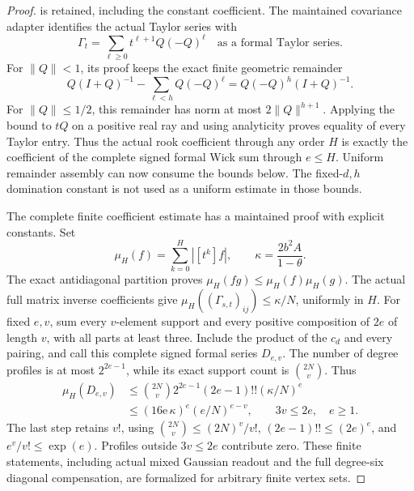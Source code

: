 \begin{proof}
is retained, including the constant coefficient.
The maintained covariance adapter identifies the actual Taylor series with
\[
 \Gamma_t=\sum_{\ell\geq0}t^{\ell+1}Q(-Q)^\ell
 \quad\text{as a formal Taylor series}.
\]
For \(\|Q\|<1\), its proof keeps the exact finite geometric remainder
\[
 Q(I+Q)^{-1}-\sum_{\ell<h}Q(-Q)^\ell
       =Q(-Q)^h(I+Q)^{-1}.
\]
For \(\|Q\|\leq1/2\), this remainder has norm at most
\(2\|Q\|^{h+1}\). Applying the bound to \(tQ\) on a positive
real ray and using analyticity proves equality of every Taylor entry.
Thus the actual rook coefficient through any order \(H\) is exactly the
coefficient of the complete signed formal Wick sum through \(e\leq H\).
Uniform remainder assembly can now consume the bounds below.
The fixed-\(d,h\) domination constant is not used as a uniform estimate in
those bounds.

The complete finite coefficient estimate has a maintained proof with
explicit constants. Set
\[
 \mu_H(f)=\sum_{k=0}^{H}|[t^k]f|,\qquad
 \kappa=\frac{2b^2A}{1-\theta}.
\]
The exact antidiagonal partition proves
\(\mu_H(fg)\leq\mu_H(f)\mu_H(g)\).
The actual full matrix inverse coefficients give
\(\mu_H((\Gamma_{s,t})_{ij})\leq\kappa/N\), uniformly in \(H\).
For fixed \(e,v\), sum every \(v\)-element support and every positive
composition of \(2e\) of length \(v\), with all parts at least three.
Include the product of the \(c_d\) and every pairing, and call this
complete signed formal series \(D_{e,v}\).
The number of degree profiles is at most \(2^{2e-1}\), while its
exact support count is \(\binom{2N}{v}\). Thus
\[
 \begin{split}
 \mu_H(D_{e,v})
 &\leq\binom{2N}{v}2^{2e-1}(2e-1)!!(\kappa/N)^e\\
 &\leq(16\mathrm e\,\kappa)^e(e/N)^{e-v},
                         \qquad 3v\leq2e,\quad e\geq1.
 \end{split}
\]
The last step retains \(v!\), using
\(\binom{2N}{v}\leq(2N)^v/v!\),
\((2e-1)!!\leq(2e)^e\), and \(e^v/v!\leq\exp(e)\).
Profiles outside \(3v\leq2e\) contribute zero.
These finite statements, including actual mixed Gaussian readout
and the full degree-six diagonal compensation, are formalized for
arbitrary finite vertex sets.


\end{proof}
